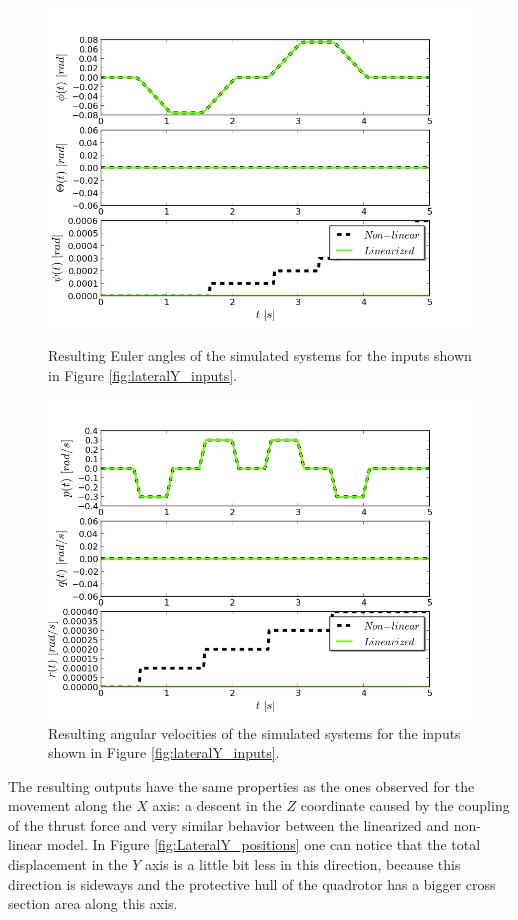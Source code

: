 \begin{figure}[h!]
\centering
\includegraphics[scale=0.7]{Images/Chapter3/Lateral_Y/Euler_Angles.png}
\caption{Resulting Euler angles of the simulated systems for the inputs shown in Figure \ref{fig:lateralY_inputs}.}
\label{fig:LateralY_Euler}

\includegraphics[scale=0.7]{Images/Chapter3/Lateral_Y/Angular_velocities.png}
\caption{Resulting angular velocities of the simulated systems for the inputs shown in Figure \ref{fig:lateralY_inputs}.}
\label{fig:LateralY_angvelocities}
\end{figure}

The resulting outputs have the same properties as the ones observed for the movement along the $X$ axis: a descent in the $Z$ coordinate caused by the coupling of the thrust force and very similar behavior between the linearized and non-linear model. In Figure \ref{fig:LateralY_positions} one can notice that the total displacement in the $Y$ axis is a little bit less in this direction, because this direction is sideways and the protective hull of the quadrotor has a bigger cross section area along this axis. 
\newpage


